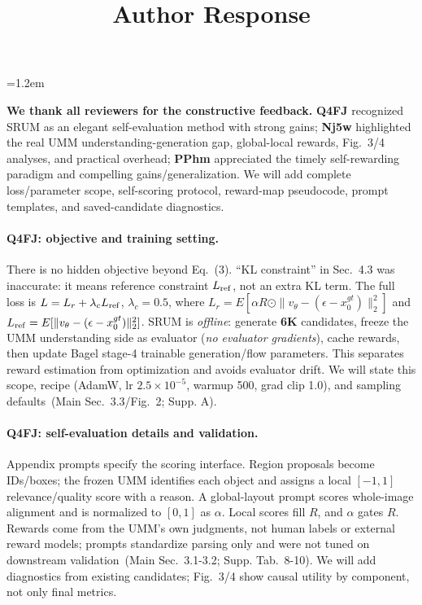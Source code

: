 \documentclass[10pt,twocolumn,letterpaper]{article}
\newcommand{\RQ}{\textcolor{revred}{\textbf{Q4FJ}}}
\newcommand{\RN}{\textcolor{revblue}{\textbf{Nj5w}}}
\newcommand{\RP}{\textcolor{revgreen}{\textbf{PPhm}}}
\newcommand{\good}[1]{\textcolor{revgreen}{\textbf{#1}}}
\newcommand{\src}[1]{\textcolor{revblue}{\footnotesize\,(#1)}}
\newcommand{\tightpara}[1]{\vspace{-0.9em}\paragraph{#1}\vspace{-0.25em}}
\begin{document}
\setlength{\linenumbersep}{0.35cm}
\emergencystretch=1.2em
\setlength{\abovedisplayskip}{2pt}
\setlength{\belowdisplayskip}{2pt}
\setlength{\abovedisplayshortskip}{1pt}
\setlength{\belowdisplayshortskip}{1pt}

\title{Author Response}

\maketitle
\thispagestyle{empty}
\appendix
\vspace{-2.2em}


\noindent\textbf{We thank all reviewers for the constructive feedback.}
\RQ{} recognized SRUM as an elegant self-evaluation method with strong gains; \RN{} highlighted the real UMM understanding-generation gap, global-local rewards, Fig.~3/4 analyses, and practical overhead; \RP{} appreciated the timely self-rewarding paradigm and compelling gains/generalization. We will add complete loss/parameter scope, self-scoring protocol, reward-map pseudocode, prompt templates, and saved-candidate diagnostics.

\tightpara{\RQ: objective and training setting.}
There is no hidden objective beyond Eq.~(3). ``KL constraint'' in Sec.~4.3 was inaccurate: it means reference constraint \(L_{\rm ref}\), not an extra KL term. The full loss is \(L=L_r+\lambda_cL_{\rm ref}\), \good{\(\lambda_c=0.5\)}, where \(L_r=E[\alpha R\odot\|v_\theta-(\epsilon-x^{gt}_0)\|_2^2]\) and \(L_{\rm ref}=E[\|v_\theta-(\epsilon-x^{gt}_0)\|_2^2]\). SRUM is \emph{offline}: generate \good{6K} candidates, freeze the UMM understanding side as evaluator (\emph{no evaluator gradients}), cache rewards, then update Bagel stage-4 trainable generation/flow parameters. This separates reward estimation from optimization and avoids evaluator drift. We will state this scope, recipe (AdamW, lr \good{\(2.5{\times}10^{-5}\)}, warmup 500, grad clip 1.0), and sampling defaults \src{Main Sec.~3.3/Fig.~2; Supp. A}.

\tightpara{\RQ: self-evaluation details and validation.}
Appendix prompts specify the scoring interface. Region proposals become IDs/boxes; the frozen UMM identifies each object and assigns a local \([-1,1]\) relevance/quality score with a reason. A global-layout prompt scores whole-image alignment and is normalized to \([0,1]\) as \(\alpha\). Local scores fill \(R\), and \(\alpha\) gates \(R\). Rewards come from the UMM's own judgments, not human labels or external reward models; prompts standardize parsing only and were not tuned on downstream validation \src{Main Sec.~3.1-3.2; Supp. Tab.~8-10}. We will add diagnostics from existing candidates; Fig.~3/4 show causal utility by component, not only final metrics.
\end{document}
